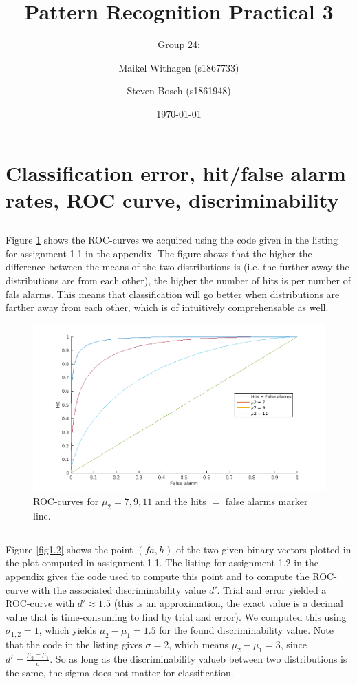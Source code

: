 \documentclass[10pt]{article}
\title{Pattern Recognition Practical 3}
\author{Group 24: \and Maikel Withagen (s1867733) \and Steven Bosch (s1861948)}
\date{\today}
\begin{document}
\maketitle

\section{Classification error, hit/false alarm rates, ROC curve, discriminability}
\subsection{}
Figure \ref{fig1.1} shows the ROC-curves we acquired using the code given in the listing for assignment 1.1 in the appendix. The figure shows that the higher the difference between the means of the two distributions is (i.e. the further away the distributions are from each other), the higher the number of hits is per number of fals alarms. This means that classification will go better when distributions are farther away from each other, which is of intuitively comprehensable as well.

\begin{figure}[H]
 \centering
 \includegraphics[width=\textwidth]{assign1_1.png}
 \caption{ROC-curves for $\mu_2={7, 9, 11}$ and the hits $=$ false alarms marker line.}
 \label{fig1.1}
\end{figure}

\subsection{}
Figure \ref{fig1.2} shows the point $(fa, h)$ of the two given binary vectors plotted in the plot computed in assignment 1.1. The listing for assignment 1.2 in the appendix gives the code used to compute this point and to compute the ROC-curve with the associated discriminability value $d'$. Trial and error yielded a ROC-curve with $d' \approx 1.5$ (this is an approximation, the exact value is a decimal value that is time-consuming to find by trial and error). We computed this using $\sigma_{1,2} = 1$, which yields $\mu_2-\mu_1 = 1.5$ for the found discriminability value. Note that the code in the listing gives $\sigma = 2$, which means $\mu_2-\mu_1 = 3$, since $d' = \frac{\mu_2-\mu_1}{\sigma}$. So as long as the discriminability valueb between two distributions is the same, the sigma does not matter for classification. 
\end{document}
